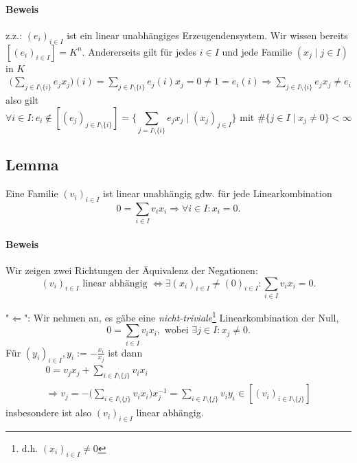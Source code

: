  	\paragraph{Beweis}
 		z.z.: $ (e_i)_{i\in I} $ ist ein linear unabhängiges Erzeugendensystem. Wir wissen bereits $ [(e_i)_{i\in I}] = K^n $. Andererseits gilt für jedes $i\in I$ und jede Familie $(x_j\mid j\in I)$ in $ K $
 		\begin{gather*}
 			\Big(\sum_{j\in I\setminus\{i\}}e_jx_j\Big)(i) = \sum_{j\in I\setminus\{i\}}e_j(i)x_j = 0 \neq 1 = e_i(i) \Rightarrow \sum_{j\in I\setminus\{i\}} e_jx_j \neq e_i
 		\end{gather*}
 		also gilt
 		\begin{equation*}
 			\forall i\in I: e_i \notin [(e_j)_{j\in I\setminus\{i\}}] = \Big\{\sum_{j=I\setminus\{i\}} e_jx_j\mid (x_j)_{ j\in I}\Big\} \text{ mit } \#\{j\in I\mid x_j \neq 0\}<\infty
 		\end{equation*}

 \subsection{Lemma}
 	\begin{Lemma}
 		Eine Familie $(v_i)_{i\in I}$ ist linear unabhängig gdw. für jede Linearkombination
 		\[
 			0 = \sum_{i\in I} v_ix_i \Rightarrow \forall i\in I: x_i = 0.
 		\]
 	\end{Lemma}

 	\paragraph{Beweis}
 		Wir zeigen zwei Richtungen der Äquivalenz der Negationen:
 		\[
 			(v_i)_{i\in I} \text{ linear abhängig } \Leftrightarrow \exists(x_i)_{i\in I} \neq (0)_{i\in I}: \sum_{i\in I} v_ix_i = 0.
 		\]

 		"$\Leftarrow$":
 		Wir nehmen an, es gäbe eine \emph{nicht-triviale}\footnote{d.h. $(x_i)_{i\in I}\neq 0$} Linearkombination der Null,
 		\[
 			0 = \sum_{i\in I} v_ix_i, \text{ wobei } \exists j\in I: x_j \neq 0.
 		\]
 		Für $(y_i)_{i\in I}, y_i := - \frac{x_i}{x_j}$ ist dann
 		\begin{gather*}
 			0 = v_jx_j + \sum_{i\in I\setminus\{j\}} v_ix_i \\
 			\Rightarrow v_j = -\Big(\sum_{i\in I\setminus\{j\}}v_ix_i\Big)x_j^{-1} = \sum_{i\in I\setminus\{j\}} v_iy_i \in [(v_i)_{i\in I\setminus\{j\}}]
 		\end{gather*}
 		insbesondere ist also $(v_i)_{i\in I}$ linear abhängig.

